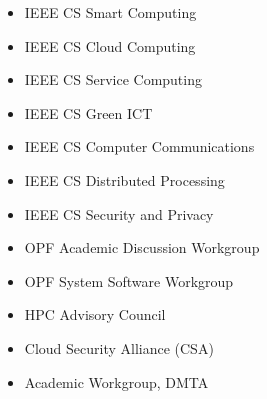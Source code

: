 \begin{itemize}
\item IEEE CS Smart Computing
\item IEEE CS Cloud Computing 
\item IEEE CS Service Computing
\item IEEE CS Green ICT
\item IEEE CS Computer Communications
\item IEEE CS Distributed Processing 
\item IEEE CS Security and Privacy
\item OPF Academic Discussion Workgroup
\item OPF System Software Workgroup
\item HPC Advisory Council
\item Cloud Security Alliance (CSA)
\item Academic Workgroup, DMTA
\end{itemize}	

